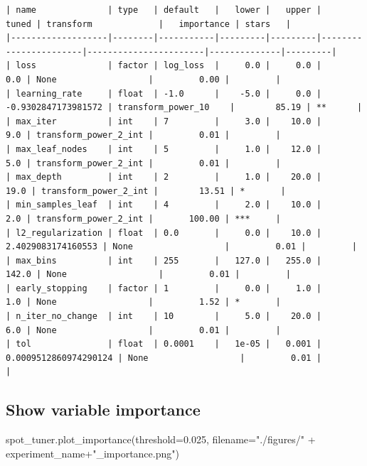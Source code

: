 \documentclass[
  letterpaper,
  DIV=11,
  numbers=noendperiod]{scrreprt}
\newenvironment{Shaded}{\begin{snugshade}}{\end{snugshade}}
\newcommand{\FloatTok}[1]{\textcolor[rgb]{0.68,0.00,0.00}{#1}}
\newcommand{\NormalTok}[1]{\textcolor[rgb]{0.00,0.23,0.31}{#1}}
\newcommand{\OperatorTok}[1]{\textcolor[rgb]{0.37,0.37,0.37}{#1}}
\newcommand{\StringTok}[1]{\textcolor[rgb]{0.13,0.47,0.30}{#1}}
\begin{document}
\begin{verbatim}
| name              | type   | default   |   lower |   upper |                 tuned | transform             |   importance | stars   |
|-------------------|--------|-----------|---------|---------|-----------------------|-----------------------|--------------|---------|
| loss              | factor | log_loss  |     0.0 |     0.0 |                   0.0 | None                  |         0.00 |         |
| learning_rate     | float  | -1.0      |    -5.0 |     0.0 |   -0.9302847173981572 | transform_power_10    |        85.19 | **      |
| max_iter          | int    | 7         |     3.0 |    10.0 |                   9.0 | transform_power_2_int |         0.01 |         |
| max_leaf_nodes    | int    | 5         |     1.0 |    12.0 |                   5.0 | transform_power_2_int |         0.01 |         |
| max_depth         | int    | 2         |     1.0 |    20.0 |                  19.0 | transform_power_2_int |        13.51 | *       |
| min_samples_leaf  | int    | 4         |     2.0 |    10.0 |                   2.0 | transform_power_2_int |       100.00 | ***     |
| l2_regularization | float  | 0.0       |     0.0 |    10.0 |    2.4029083174160553 | None                  |         0.01 |         |
| max_bins          | int    | 255       |   127.0 |   255.0 |                 142.0 | None                  |         0.01 |         |
| early_stopping    | factor | 1         |     0.0 |     1.0 |                   1.0 | None                  |         1.52 | *       |
| n_iter_no_change  | int    | 10        |     5.0 |    20.0 |                   6.0 | None                  |         0.01 |         |
| tol               | float  | 0.0001    |   1e-05 |   0.001 | 0.0009512860974290124 | None                  |         0.01 |         |
\end{verbatim}

\hypertarget{show-variable-importance-2}{%
\subsection{Show variable importance}\label{show-variable-importance-2}}

\begin{Shaded}
\begin{Highlighting}[]
\NormalTok{spot\_tuner.plot\_importance(threshold}\OperatorTok{=}\FloatTok{0.025}\NormalTok{, filename}\OperatorTok{=}\StringTok{"./figures/"} \OperatorTok{+}\NormalTok{ experiment\_name}\OperatorTok{+}\StringTok{"\_importance.png"}\NormalTok{)}
\end{Highlighting}
\end{Shaded}
\end{document}
